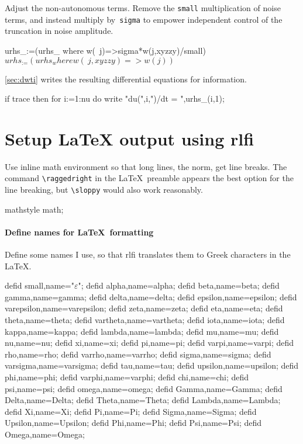 \documentclass[11pt,a5paper]{article}
\def\eps{\ensuremath{\varepsilon}}
\begin{document}
Adjust the non-autonomous terms. Remove the \verb|small|
multiplication of noise terms, and instead multiply
by~\verb|sigma| to empower independent control of the
truncation in noise amplitude.
\begin{reduce}
urhs_:=(urhs_ where w(~j)=>sigma*w(j,xyzzy)/small)$
urhs_:=(urhs_ where w(~j,xyzzy)=>w(j))$
\end{reduce}
\cref{sec:dwti} writes the resulting differential
equations for information.
\begin{reduce}
if trace then for i:=1:nu do 
    write "du(",i,")/dt = ",urhs_(i,1);
\end{reduce}






\section{Setup LaTeX output using rlfi}

Use inline math environment so that long lines, the norm,
get line breaks. The command \verb|\raggedright| in the
\LaTeX\ preamble appears the best option for the line
breaking, but \verb|\sloppy| would also work reasonably.
\begin{reduce}
mathstyle math;
\end{reduce}

\paragraph{Define names for \LaTeX\ formatting}

Define some names I use, so that rlfi translates them to
Greek characters in the \LaTeX.
\begin{reduce}
defid small,name="\eps";%
defid alpha,name=alpha;
defid beta,name=beta;
defid gamma,name=gamma;
defid delta,name=delta;
defid epsilon,name=epsilon;
defid varepsilon,name=varepsilon;
defid zeta,name=zeta;
defid eta,name=eta;
defid theta,name=theta;
defid vartheta,name=vartheta;
defid iota,name=iota;
defid kappa,name=kappa;
defid lambda,name=lambda;
defid mu,name=mu;
defid nu,name=nu;
defid xi,name=xi;
defid pi,name=pi;
defid varpi,name=varpi;
defid rho,name=rho;
defid varrho,name=varrho;
defid sigma,name=sigma;
defid varsigma,name=varsigma;
defid tau,name=tau;
defid upsilon,name=upsilon;
defid phi,name=phi;
defid varphi,name=varphi;
defid chi,name=chi;
defid psi,name=psi;
defid omega,name=omega;
defid Gamma,name=Gamma;
defid Delta,name=Delta;
defid Theta,name=Theta;
defid Lambda,name=Lambda;
defid Xi,name=Xi;
defid Pi,name=Pi;
defid Sigma,name=Sigma;
defid Upsilon,name=Upsilon;
defid Phi,name=Phi;
defid Psi,name=Psi;
defid Omega,name=Omega;
\end{reduce}
\end{document}
